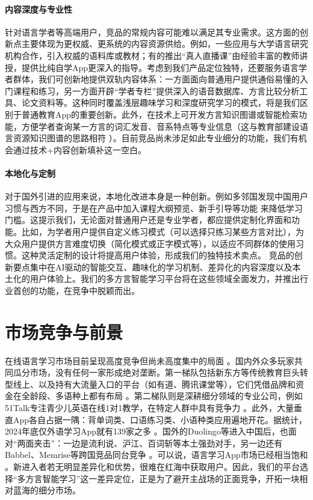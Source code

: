 \paragraph{内容深度与专业性}
针对语言学者等高端用户，竞品的常规内容可能难以满足其专业需求。这方面的创新点主要体现为更权威、更系统的内容资源供给。例如，一些应用与大学语言研究机构合作，引入权威的语料库或教材；有的推出“真人直播课”由经验丰富的教师讲授，提供比纯自学App更深入的指导。考虑到我们产品定位独特，还要服务语言学者群体，我们可创新地提供双轨内容体系：一方面面向普通用户提供通俗易懂的入门课程和练习，另一方面开辟“学者专栏”提供深入的语音数据库、方言比较分析工具、论文资料等。这种同时覆盖浅层趣味学习和深度研究学习的模式，将是我们区别于普通教育App的重要创新。此外，在技术上可开发方言知识图谱或智能检索功能，方便学者查询某一方言的词汇发音、音系特点等专业信息（这与教育部建设语言资源知识图谱的思路相符 ）。目前竞品尚未涉足如此专业细分的功能，我们有机会通过技术+内容创新填补这一空白。
\paragraph{本地化与定制}
对于国外引进的应用来说，本地化改进本身是一种创新。例如多邻国发现中国用户习惯与西方不同，于是在产品中加入课程大纲预览、新手引导等功能 来降低学习门槛。这提示我们，无论面对普通用户还是专业学者，都应提供定制化界面和功能。比如，为学者用户提供自定义练习模式（可以选择只练习某些方言对比），为大众用户提供方言难度切换（简化模式或正字模式等），以适应不同群体的使用习惯。这种灵活定制的设计将提高用户体验，形成我们的独特技术卖点。
竞品的创新要点集中在AI驱动的智能交互、趣味化的学习机制、差异化的内容深度以及本土化的用户体验上。我们的多方言智能学习平台将在这些领域全面发力，并推出行业首创的功能，在竞争中脱颖而出。
\section{市场竞争与前景}
在线语言学习市场目前呈现高度竞争但尚未高度集中的局面 。国内外众多玩家共同瓜分市场，没有任何一家形成绝对垄断。第一梯队包括新东方等传统教育巨头转型线上、以及持有大流量入口的平台（如有道、腾讯课堂等），它们凭借品牌和资金在全龄段、多语种上都有布局 。第二梯队则是深耕细分领域的专业公司，例如51Talk专注青少儿英语在线1对1教学，在特定人群中具有竞争力 。此外，大量垂直App各自占据一隅：背单词类、口语练习类、小语种类应用遍地开花。据统计，2024年底仅外语学习App就有139家之多 。国外的Duolingo等进入中国后，也面对“两面夹击”：一边是流利说、沪江、百词斩等本土强劲对手，另一边还有Babbel、Memrise等跨国竞品同台竞争 。可以说，语言学习App市场已经相当饱和 。新进入者若无明显差异化和优势，很难在红海中获取用户。因此，我们的平台选择“多方言智能学习”这一差异定位，正是为了避开主战场的正面竞争，开拓一块相对蓝海的细分市场。

